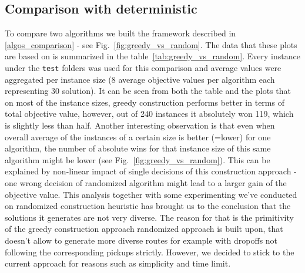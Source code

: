 \documentclass[a4paper]{scrartcl}
\begin{document}
\subsection{Comparison with deterministic}
To compare two algorithms we built the framework described in \ref{algos_comparison} - see Fig.~\ref{fig:greedy_vs_random}. The data that these plots are based on is summarized in the table~\ref{tab:greedy_vs_random}. Every instance under the \texttt{test} folders was used for this comparison and average values were aggregated per instance size (8 average objective values per algorithm each representing 30 solution). It can be seen from both the table and the plots that on most of the instance sizes, greedy construction performs better in terms of total objective value, however, out of 240 instances it absolutely won 119, which is slightly less than half. Another interesting observation is that even when overall average of the instances of a certain size is better (=lower) for one algorithm, the number of absolute wins for that instance size of this same algorithm might be lower (see Fig.~\ref{fig:greedy_vs_random}). This can be explained by non-linear impact of single decisions of this construction approach - one wrong decision of randomized algorithm might lead to a larger gain of the objective value.
This analysis together with some experimenting we've conducted on randomized construction heuristic has brought us to the conclusion that the solutions it generates are not very diverse. The reason for that is the primitivity of the greedy construction approach randomized approach is built upon, that doesn't allow to generate more diverse routes for example with dropoffs not following the corresponding pickups strictly. However, we decided to stick to the current approach for reasons such as simplicity and time limit. 
\end{document}
